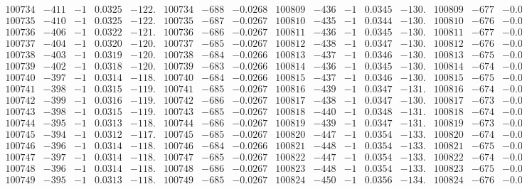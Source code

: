 \documentclass[11pt,reqno,a4letter]{article}
\numberwithin{figure}{section}
\numberwithin{table}{section}
\theoremstyle{plain}
\numberwithin{theorem}{section}
\theoremstyle{definition}
\begin{document}
\begin{table}[ht!]
\begin{equation*}
{\begin{array}{ccccc|ccc||ccccc|ccc}
100734 & -411 & -1 & 0.0325 & -122. & 100734 & -688 & -0.0268 & 100809 & -436 & -1 & 0.0345 & -130. & 100809 & -677 & -0.0263  \\
100735 & -410 & -1 & 0.0325 & -122. & 100735 & -687 & -0.0267 & 100810 & -435 & -1 & 0.0344 & -130. & 100810 & -676 & -0.0263  \\
100736 & -406 & -1 & 0.0322 & -121. & 100736 & -686 & -0.0267 & 100811 & -436 & -1 & 0.0345 & -130. & 100811 & -677 & -0.0263  \\
100737 & -404 & -1 & 0.0320 & -120. & 100737 & -685 & -0.0267 & 100812 & -438 & -1 & 0.0347 & -130. & 100812 & -676 & -0.0263  \\
100738 & -403 & -1 & 0.0319 & -120. & 100738 & -684 & -0.0266 & 100813 & -437 & -1 & 0.0346 & -130. & 100813 & -675 & -0.0262  \\
100739 & -402 & -1 & 0.0318 & -120. & 100739 & -683 & -0.0266 & 100814 & -436 & -1 & 0.0345 & -130. & 100814 & -674 & -0.0262  \\
100740 & -397 & -1 & 0.0314 & -118. & 100740 & -684 & -0.0266 & 100815 & -437 & -1 & 0.0346 & -130. & 100815 & -675 & -0.0262  \\
100741 & -398 & -1 & 0.0315 & -119. & 100741 & -685 & -0.0267 & 100816 & -439 & -1 & 0.0347 & -131. & 100816 & -674 & -0.0262  \\
100742 & -399 & -1 & 0.0316 & -119. & 100742 & -686 & -0.0267 & 100817 & -438 & -1 & 0.0347 & -130. & 100817 & -673 & -0.0262  \\
100743 & -398 & -1 & 0.0315 & -119. & 100743 & -685 & -0.0267 & 100818 & -440 & -1 & 0.0348 & -131. & 100818 & -674 & -0.0262  \\
100744 & -395 & -1 & 0.0313 & -118. & 100744 & -686 & -0.0267 & 100819 & -439 & -1 & 0.0347 & -131. & 100819 & -673 & -0.0262  \\
100745 & -394 & -1 & 0.0312 & -117. & 100745 & -685 & -0.0267 & 100820 & -447 & -1 & 0.0354 & -133. & 100820 & -674 & -0.0262  \\
100746 & -396 & -1 & 0.0314 & -118. & 100746 & -684 & -0.0266 & 100821 & -448 & -1 & 0.0354 & -133. & 100821 & -675 & -0.0262  \\
100747 & -397 & -1 & 0.0314 & -118. & 100747 & -685 & -0.0267 & 100822 & -447 & -1 & 0.0354 & -133. & 100822 & -674 & -0.0262  \\
100748 & -396 & -1 & 0.0314 & -118. & 100748 & -686 & -0.0267 & 100823 & -448 & -1 & 0.0354 & -133. & 100823 & -675 & -0.0262  \\
100749 & -395 & -1 & 0.0313 & -118. & 100749 & -685 & -0.0267 & 100824 & -450 & -1 & 0.0356 & -134. & 100824 & -676 & -0.0263  \\

\end{array}}
\end{equation*}
\end{table}
\end{document}
